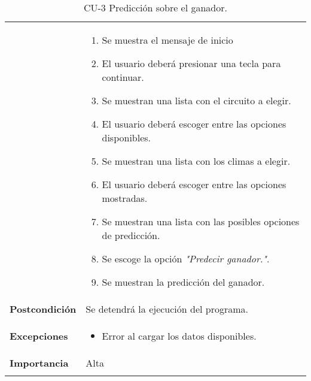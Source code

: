 \begin{longtable}[h!]{@{}ll@{}}
\begin{minipage}[t]{0.23\columnwidth}
\end{minipage} & \begin{minipage}[t]{0.71\columnwidth}\raggedright\strut
\begin{enumerate}
\def\labelenumi{\arabic{enumi}.}
\tightlist
\item 
  Se muestra  el mensaje de inicio
\item
  El usuario deberá presionar una tecla para continuar.
\item
  Se muestran una lista con el circuito a elegir.
\item
  El usuario deberá escoger entre las opciones disponibles.
\item
  Se muestran una lista con los climas a elegir.
\item
  El usuario deberá escoger entre las opciones mostradas.
\item
  Se muestran una lista con las posibles opciones de predicción.
\item
  Se escoge la opción \textit{"Predecir ganador."}.
\item
  Se muestran la predicción del ganador.
\end{enumerate}\strut
\end{minipage}\tabularnewline
\begin{minipage}[t]{0.23\columnwidth}\raggedright\strut
\textbf{Postcondición}\strut
\end{minipage} & \begin{minipage}[t]{0.71\columnwidth}\raggedright\strut
Se detendrá la ejecución del programa.\strut
\end{minipage}\tabularnewline
\begin{minipage}[t]{0.23\columnwidth}\raggedright\strut
\textbf{Excepciones}\strut
\end{minipage} & \begin{minipage}[t]{0.71\columnwidth}\raggedright\strut
\begin{itemize}
\tightlist
\item
  Error al cargar los datos disponibles.
\end{itemize}\strut
\end{minipage}\tabularnewline
\begin{minipage}[t]{0.23\columnwidth}\raggedright\strut
\textbf{Importancia}\strut
\end{minipage} & \begin{minipage}[t]{0.71\columnwidth}\raggedright\strut
Alta\strut
\end{minipage}\tabularnewline
\bottomrule
\caption{CU-3 Predicción sobre el ganador.}
\end{longtable}

